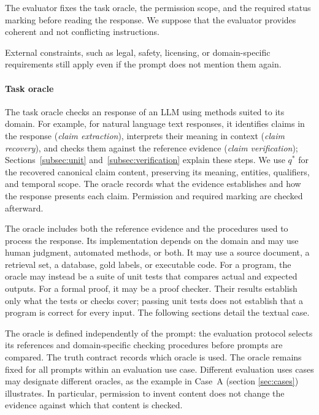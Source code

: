 \documentclass{clv2025}
\begin{document}
The evaluator fixes the task oracle, the permission scope, and the required status marking before reading the response. 
We suppose that the evaluator provides coherent and not conflicting instructions. 

External constraints, such as legal, safety, licensing, or domain-specific requirements 
still apply even if the prompt does not mention them again. 

\paragraph{Task oracle}
The task oracle checks an response of an LLM using methods suited to its domain. For example, for natural language text responses, it identifies claims in the response (\emph{claim extraction}),
interprets their meaning in context (\emph{claim recovery}),
and checks them against the reference evidence (\emph{claim verification}); Sections~\ref{subsec:unit}
and~\ref{subsec:verification} explain these steps. We use $q^*$ for the recovered
canonical claim content, preserving its meaning, entities, qualifiers, and temporal
scope. The oracle records what the evidence establishes and how the response
presents each claim. Permission and required marking are checked afterward.

The oracle includes both the reference evidence and the procedures used to
process the response. Its implementation depends on the domain and may use
human judgment, automated methods, or both. It may use a source document,
a retrieval set, a database, gold
labels, or executable code. For a program, the oracle may instead be a suite
of unit tests that compares actual and expected outputs. For a formal proof,
it may be a proof checker. %
Their results establish only what the tests or
checks cover; passing unit tests does not establish that a program is correct
for every input. The following sections detail the textual case.

The oracle is defined independently of the prompt: the evaluation protocol
selects its references and domain-specific checking procedures before prompts are
compared. The truth contract records which oracle is used.%
The oracle remains fixed for all prompts
 within an evaluation use case. Different evaluation uses cases may designate
different oracles, as the example in Case~A (section \ref{sec:cases}) illustrates. In particular, permission to invent
content does not change the evidence against which that content is checked.
\end{document}
